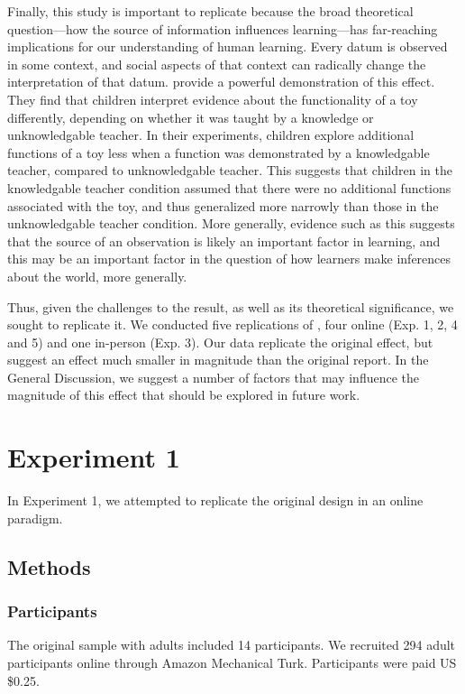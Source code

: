 \documentclass[man]{apa2}
\begin{document}
Finally, this study is important to replicate because the broad theoretical question---how the source of information influences learning---has far-reaching implications for our understanding of human learning. Every datum is observed in some context, and social aspects of that context can radically change the interpretation of that datum.  provide a powerful demonstration of this effect. They find that children interpret evidence about the functionality of a toy differently, depending on whether it was taught by a knowledge or unknowledgable teacher. In their experiments, children explore additional  functions of a toy less when a function was demonstrated by a knowledgable teacher, compared to unknowledgable teacher. This suggests that children in the knowledgable teacher condition assumed that there were no additional functions associated with the toy, and thus generalized more narrowly than those in the unknowledgable teacher condition. More generally, evidence such as this suggests that the source of an observation is likely an important factor in learning, and this may be an important factor in the question of how learners make inferences about the world, more generally.

Thus, given the challenges to the  result, as well as its theoretical significance, we sought to replicate it. We conducted five replications of , four online (Exp. 1, 2,  4 and 5) and one in-person (Exp. 3). Our data replicate the original effect, but suggest an effect much smaller in magnitude than the original report. In the General Discussion, we suggest a number of factors that may influence the magnitude of this effect that should be explored in future work.
 
\section{Experiment 1} 
In Experiment 1, we attempted to replicate the original design in an online paradigm. 

\subsection{Methods}
\subsubsection{Participants} 
The original sample with adults included 14 participants. We recruited 294 adult participants online through Amazon Mechanical Turk. Participants were paid US \$0.25. 
\end{document}
